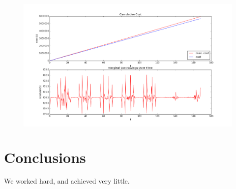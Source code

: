 \documentclass[12pt]{article}
\begin{document}
\begin{figure}[H]
\includegraphics[width=\textwidth]{costsummary}
\end{figure}

\section{Conclusions}\label{conclusions}
We worked hard, and achieved very little.



\end{document}
